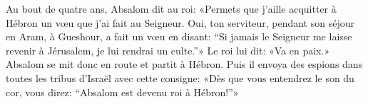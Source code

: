 Au bout de quatre ans, Absalom dit au roi:
	«Permets que j’aille acquitter à Hébron un vœu que j’ai fait au Seigneur.
Oui, ton serviteur, pendant son séjour en Aram, à Gueshour, a fait un vœu en disant:
	“Si jamais le Seigneur me laisse revenir à Jérusalem, je lui rendrai un culte.”»
Le roi lui dit: «Va en paix.»
Absalom se mit donc en route et partit à Hébron.
Puis il envoya des espions dans toutes les tribus d’Israël avec cette consigne:
	«Dès que vous entendrez le son du cor, vous direz:
	“Absalom est devenu roi à Hébron!”»
